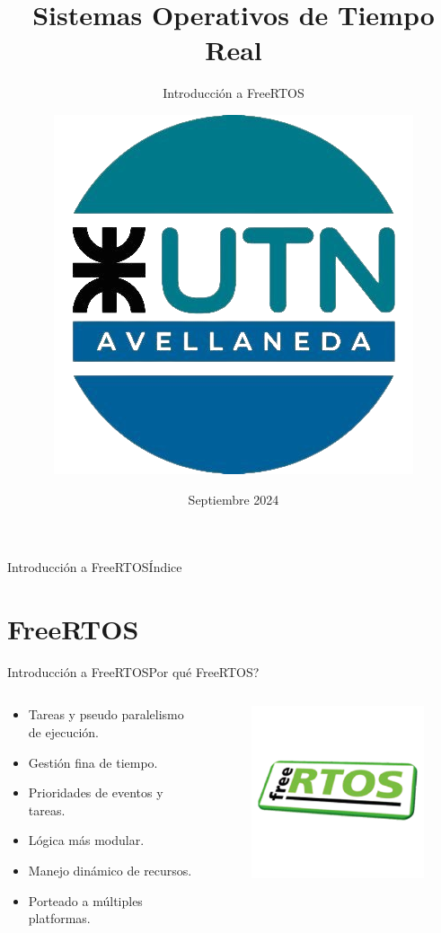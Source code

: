 \documentclass[aspectratio=169, xcolor=dvipsnames]{beamer}
\title{Sistemas Operativos de Tiempo Real}
\subtitle{Introducción a FreeRTOS}
\author[Fabrizio Carlassara - Laboratorio de Sistemas Embebidos]{\includegraphics[scale=0.15]{resources/images/utn_logo.png}}
\institute{UTN FRA\\Departamento de Ingeniería Electrónica\\Técnicas Digitales II}
\date[]{Septiembre 2024}
\begin{document}
\frame{\titlepage}
\begin{frame}{Introducción a FreeRTOS}{Índice}
\begin{multicols}{2}
\tableofcontents
\end{multicols}
\end{frame}

\section{FreeRTOS}
\begin{frame}{Introducción a FreeRTOS}{Por qué FreeRTOS?}
\begin{columns}
\begin{column}{0.5\textwidth}
\begin{itemize}
    \item Tareas y pseudo paralelismo de ejecución.
    \item Gestión fina de tiempo.
    \item Prioridades de eventos y tareas.
    \item Lógica más modular.
    \item Manejo dinámico de recursos.
    \item Porteado a múltiples platformas.
\end{itemize}
\end{column}
\begin{column}{0.5\textwidth}
\begin{figure}
\centering
\includegraphics[width=0.75\linewidth]{resources/images/freertos_logo.png}
\end{figure}
\end{column}
\end{columns}
\end{frame}
\end{document}
